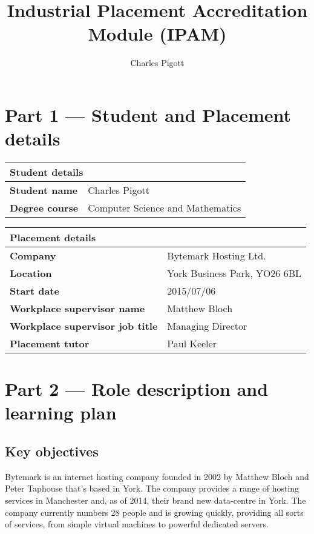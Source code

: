 \documentclass[12pt,a4paper]{article}
\title{Industrial Placement Accreditation Module (IPAM)}
\author{Charles Pigott}
\begin{document}
\maketitle

\section*{Part 1 --- Student and Placement details}

\noindent\begin{tabular}{ll}
	\multicolumn{2}{l}{\textbf{Student details}}              \\
	\toprule
	\textbf{Student name}  & Charles Pigott                   \\
	\midrule
	\textbf{Degree course} & Computer Science and Mathematics \\
	\bottomrule
\end{tabular}

\vspace{2em}

\noindent\begin{tabular}{ll}
	\multicolumn{2}{l}{\textbf{Placement details}}                         \\
	\toprule
	\textbf{Company}                        & Bytemark Hosting Ltd.        \\
	\midrule
	\textbf{Location}                       & York Business Park, YO26 6BL \\
	\midrule
	\textbf{Start date}                     & 2015/07/06                   \\
	\midrule
	\textbf{Workplace supervisor name}      & Matthew Bloch                \\
	\midrule
	\textbf{Workplace supervisor job title} & Managing Director            \\
	\midrule
	\textbf{Placement tutor}                & Paul Keeler                  \\
	\bottomrule
\end{tabular}

\section*{Part 2 --- Role description and learning plan}
\subsection*{Key objectives}
	Bytemark is an internet hosting company founded in 2002 by Matthew Bloch and
	Peter Taphouse that's based in York. The company provides a range of hosting
	services in Manchester and, as of 2014, their brand new data-centre in York.
	The company currently numbers 28 people and is growing quickly, providing
	all sorts of services, from simple virtual machines to powerful dedicated
	servers.
\end{document}
